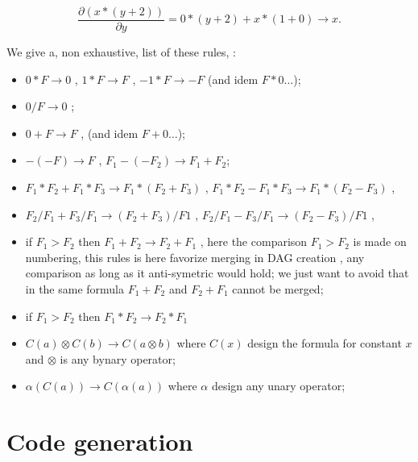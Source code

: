 \begin{equation}
	\frac{\partial(x*(y+2))}{\partial y}
	=  0 * (y+2) + x * (1 + 0)
	\rightarrow x
	\label{Form:Reduc}.
\end{equation}

We give a, non exhaustive, list of these rules, :

\begin{itemize}
     \item  $0*F \rightarrow 0$ ,   $1*F  \rightarrow F$ , $-1*F \rightarrow -F$ (and idem $F*0\dots$);

     \item  $0/F \rightarrow 0$ ;

     \item  $0+F \rightarrow F$ ,   (and idem $F+0\dots$);

     \item  $-(-F) \rightarrow F$ ,  $F_1-(-F_2) \rightarrow F_1+F_2$;

     \item  $F_1*F_2 + F_1*F_3  \rightarrow F_1*(F_2+F_3)$ , $F_1*F_2 - F_1*F_3  \rightarrow F_1*(F_2-F_3)$ , 
     \item  $F_2/F_1 + F_3/F_1  \rightarrow (F_2+F_3)/F1$ ,  $F_2/F_1 - F_3/F_1  \rightarrow (F_2-F_3)/F1$ , 

     \item if  $F_1 > F_2$ then  $F_1 + F_2  \rightarrow F_2 + F_1$ , here the comparison $F_1 > F_2$ 
           is made on numbering, this rules is here favorize merging in DAG creation , any comparison as long
           as it anti-symetric would hold; we just want to avoid that in the same formula $F_1+F_2$ and $F_2+F_1$
	   cannot be merged;
     \item if  $F_1 > F_2$ then  $F_1 * F_2  \rightarrow F_2 * F_1$ 

     \item  $C(a) \otimes C(b) \rightarrow C(a \otimes b) $  where  $C(x)$ design the formula for constant $x$
	     and $\otimes$ is any bynary operator;
     \item  $ \alpha (C(a)) \rightarrow C(\alpha (a)) $  where  $\alpha$ design any unary operator;

\end{itemize}



\section{Code generation}



